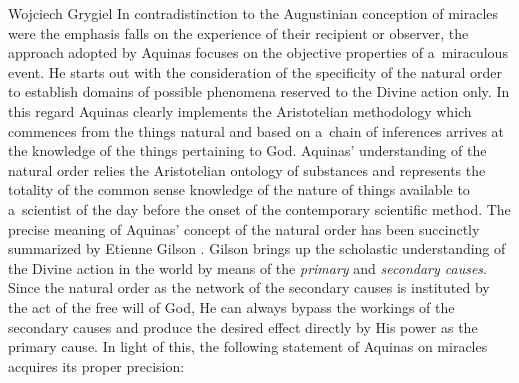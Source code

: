 \begin{artengenv}{Wojciech Grygiel}
In contradistinction to the Augustinian conception of miracles were the emphasis falls on the experience of their recipient or observer, the approach adopted by Aquinas focuses on the objective properties of a~miraculous event. He starts out with the consideration of the specificity of the natural order to establish domains of possible phenomena reserved to the Divine action only. In this regard Aquinas clearly implements the Aristotelian methodology which commences from the things natural and based on a~chain of inferences arrives at the knowledge of the things pertaining to God. Aquinas’ understanding of the natural order relies the Aristotelian ontology of substances and represents the totality of the common sense knowledge of the nature of things available to a~scientist of the day before the onset of the contemporary scientific method. The precise meaning of Aquinas’ concept of the natural order has been succinctly summarized by Etienne Gilson
\parencite*[][pp.376–377]{gilson_spirit_1991}. %
 Gilson brings up the scholastic understanding of the Divine action in the world by means of the \textit{primary} and \textit{secondary causes}. Since the natural order as the network of the secondary causes is instituted by the act of the free will of God, He can always bypass the workings of the secondary causes and produce the desired effect directly by His power as the primary cause. In light of this, the following statement of Aquinas on miracles acquires its proper precision:

\end{artengenv}
